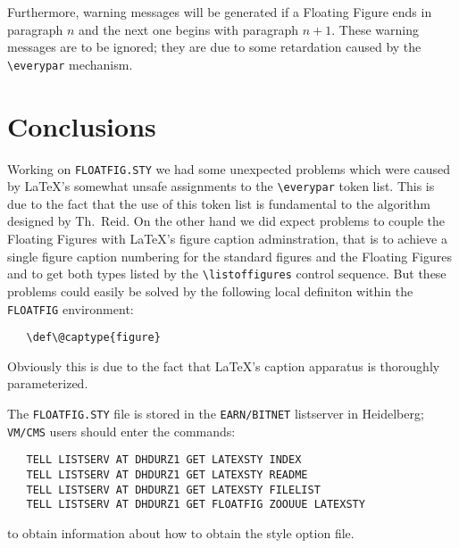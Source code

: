  Furthermore, warning messages will be generated if a Floating Figure
 ends in paragraph $n$ and the next one begins with paragraph $n+1$. 
 These warning messages are to be ignored; they are due to some retardation
 caused by the \verb+\everypar+ mechanism.
 \section{Conclusions}
 Working on {\tt FLOATFIG.STY} we had some unexpected problems 
 which were caused
 by \LaTeX's somewhat unsafe assignments to the \verb+\everypar+ token list.
 This is due to the fact that the use
 of this token list is fundamental
 to the algorithm designed by Th.~Reid.
 On the other hand we did expect problems to couple
 the Floating Figures with \LaTeX's figure caption adminstration, 
 that is to achieve a single figure caption numbering for
 the standard figures and the Floating Figures and to get both types
 listed by the \verb+\listoffigures+ control sequence.
 But these problems could easily be solved
 by the following local definiton within the {\tt FLOATFIG} environment:
 \begin{verbatim}
   \def\@captype{figure}
 \end{verbatim}
 Obviously this is due to the fact 
 that \LaTeX's caption apparatus is thoroughly parameterized.
  
 The \verb+FLOATFIG.STY+ file is stored in the 
 {\tt EARN/BITNET} listserver
 in Heidelberg; \hfil\break
 {\tt VM/CMS} users should enter the commands:
 \begin{verbatim}
   TELL LISTSERV AT DHDURZ1 GET LATEXSTY INDEX
   TELL LISTSERV AT DHDURZ1 GET LATEXSTY README
   TELL LISTSERV AT DHDURZ1 GET LATEXSTY FILELIST
   TELL LISTSERV AT DHDURZ1 GET FLOATFIG ZOOUUE LATEXSTY
 \end{verbatim}
 to obtain information about how to obtain the style option file.
  
 

